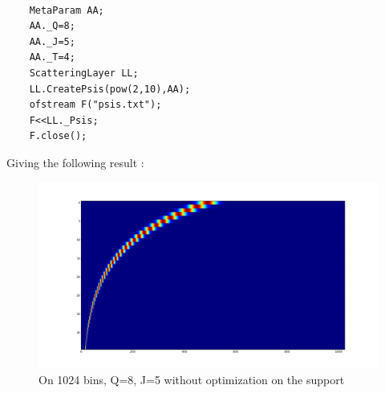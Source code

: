 \documentclass[a4paper]{report}
\begin{document}
\begin{lstlisting}
    
    MetaParam AA;
    AA._Q=8;
    AA._J=5;
    AA._T=4;
    ScatteringLayer LL;
    LL.CreatePsis(pow(2,10),AA);
    ofstream F("psis.txt");
    F<<LL._Psis;
    F.close();

\end{lstlisting}
Giving the following result :
\begin{figure}[H]
\begin{center}
\includegraphics[scale=0.21]{psis.png}\caption{On 1024 bins, Q=8, J=5 without optimization on the support}\label{psis_examples}
\end{center}
\end{figure}
\end{document}
